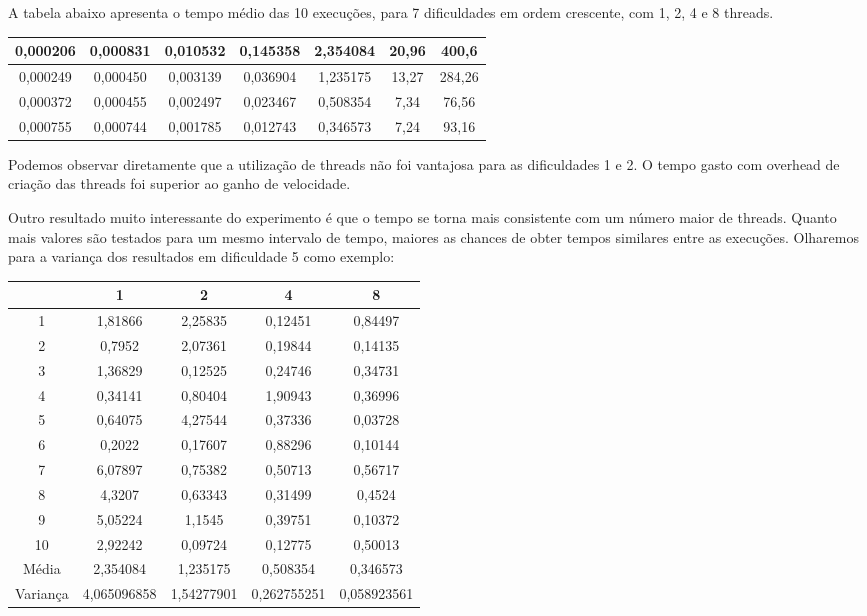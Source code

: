 \documentclass[12pt]{article}
\begin{document}
A tabela abaixo apresenta o tempo médio das 10 execuções, para 7 dificuldades em ordem crescente, com 1, 2, 4 e 8 threads.

	\begin{tabular}{|c|c|c|c|c|c|c|}
		\hline
		0,000206 & 0,000831 & 0,010532 & 0,145358 & 2,354084 & 20,96 & 400,6 \\
		\hline
		0,000249 & 0,000450 & 0,003139 & 0,036904 & 1,235175 & 13,27 & 284,26 \\
		\hline
		0,000372 & 0,000455 & 0,002497 & 0,023467 & 0,508354 & 7,34 & 76,56 \\
		\hline
		0,000755 & 0,000744 & 0,001785 & 0,012743 & 0,346573 & 7,24 & 93,16 \\
		\hline
	\end{tabular}

Podemos observar diretamente que a utilização de threads não foi vantajosa para as dificuldades 1 e 2. O tempo gasto com overhead de criação das threads foi superior ao ganho de velocidade.

Outro resultado muito interessante do experimento é que o tempo se torna mais consistente com um número maior de threads. Quanto mais valores são testados para um mesmo intervalo de tempo, maiores as chances de obter tempos similares entre as execuções. Olharemos para a variança dos resultados em dificuldade 5 como exemplo:

\begin{tabular}{|c|c|c|c|c|}
	\hline		
	& 1	& 2	& 4	& 8\\
	\hline
	1 & 1,81866	& 2,25835 & 0,12451	& 0,84497 \\
	\hline
	2 & 0,7952 & 2,07361 & 0,19844 & 0,14135 \\
	\hline
	3 & 1,36829 & 0,12525 & 0,24746 & 0,34731 \\
	\hline
	4 & 0,34141 & 0,80404 & 1,90943 & 0,36996 \\
	\hline
	5 & 0,64075 & 4,27544 & 0,37336 & 0,03728 \\
	\hline
	6 & 0,2022 & 0,17607 & 0,88296 & 0,10144 \\
	\hline
	7 & 6,07897 & 0,75382 & 0,50713 & 0,56717 \\
	\hline
	8 & 4,3207 & 0,63343 & 0,31499 & 0,4524 \\
	\hline
	9 & 5,05224 & 1,1545 & 0,39751 & 0,10372 \\
	\hline
	10 & 2,92242 & 0,09724 & 0,12775 & 0,50013 \\ 
	\hline
	Média & 2,354084 & 1,235175 & 0,508354 & 0,346573 \\
	\hline
	Variança & 4,065096858 & 1,54277901 & 0,262755251 & 0,058923561 \\
	\hline
\end{tabular}
\end{document}
